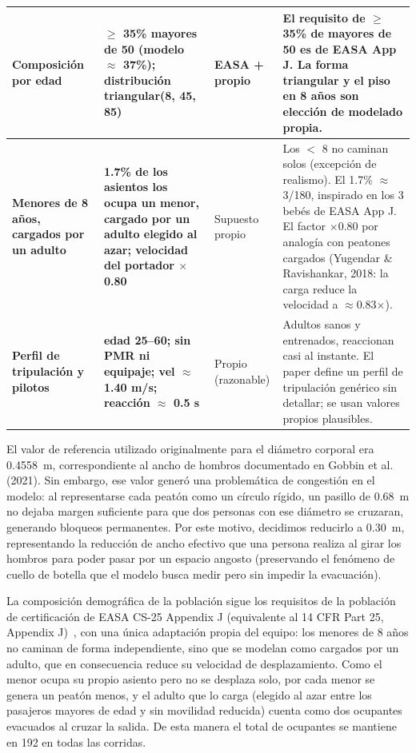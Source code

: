 \documentclass[a4paper, 11pt]{article}
\begin{document}
{\begin{longtable}{L{2.9cm}L{3.3cm}L{1.9cm}L{5.6cm}}
\midrule
\textbf{Composici\'on por edad} & \textbf{$\geq$ 35\% mayores de 50 (modelo $\approx$ 37\%); distribuci\'on triangular(8, 45, 85)} & EASA + propio & El requisito de $\geq$35\% de mayores de 50 es de EASA App J. La forma triangular y el piso en 8 a\~nos son elecci\'on de modelado propia. \\
\midrule
\textbf{Menores de 8 a\~nos, cargados por un adulto} & \textbf{1.7\% de los asientos los ocupa un menor, cargado por un adulto elegido al azar; velocidad del portador $\times$ 0.80} & Supuesto propio & Los $<$ 8 no caminan solos (excepci\'on de realismo). El 1.7\% $\approx$ 3/180, inspirado en los 3 beb\'es de EASA App J. El factor $\times$0.80 por analog\'ia con peatones cargados (Yugendar \& Ravishankar, 2018: la carga reduce la velocidad a $\approx$0.83$\times$). \\
\midrule
\textbf{Perfil de tripulaci\'on y pilotos} & \textbf{edad 25--60; sin PMR ni equipaje; vel $\approx$ 1.40 m/s; reacci\'on $\approx$ 0.5 s} & Propio (razonable) & Adultos sanos y entrenados, reaccionan casi al instante. El paper define un perfil de tripulaci\'on gen\'erico sin detallar; se usan valores propios plausibles. \\
\end{longtable}
}

El valor de referencia utilizado originalmente para el di\'ametro corporal era
0.4558~m, correspondiente al ancho de hombros documentado en Gobbin et al. (2021).
Sin embargo, ese valor gener\'o una problem\'atica de congesti\'on en el modelo: al
representarse cada peat\'on como un c\'irculo r\'igido, un pasillo de 0.68~m no
dejaba margen suficiente para que dos personas con ese di\'ametro se cruzaran,
generando bloqueos permanentes. Por este motivo, decidimos reducirlo a 0.30~m,
representando la reducci\'on de ancho efectivo que una persona realiza al girar los
hombros para poder pasar por un espacio angosto (preservando el fen\'omeno de cuello
de botella que el modelo busca medir pero sin impedir la evacuaci\'on).

La composici\'on demogr\'afica de la poblaci\'on sigue los requisitos de la
poblaci\'on de certificaci\'on de EASA CS-25 Appendix J (equivalente al 14 CFR Part
25, Appendix J)~\cite{cfrAppJ}, con una \'unica adaptaci\'on propia del equipo: los
menores de 8 a\~nos no caminan de forma independiente, sino que se modelan como
cargados por un adulto, que en consecuencia reduce su velocidad de desplazamiento.
Como el menor ocupa su propio asiento pero no se desplaza solo, por cada menor se
genera un peat\'on menos, y el adulto que lo carga (elegido al azar entre los
pasajeros mayores de edad y sin movilidad reducida) cuenta como dos ocupantes
evacuados al cruzar la salida. De esta manera el total de ocupantes se mantiene en
192 en todas las corridas.
\end{document}
